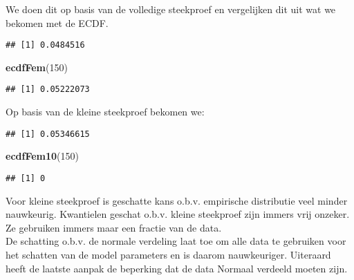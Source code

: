 \documentclass[
  12pt,dutch,coursenotes]{book}
\newenvironment{Shaded}{\begin{snugshade}}{\end{snugshade}}
\newcommand{\DecValTok}[1]{\textcolor[rgb]{0.00,0.00,0.81}{#1}}
\newcommand{\KeywordTok}[1]{\textcolor[rgb]{0.13,0.29,0.53}{\textbf{#1}}}
\newcommand{\NormalTok}[1]{#1}
\newcommand{\OperatorTok}[1]{\textcolor[rgb]{0.81,0.36,0.00}{\textbf{#1}}}
\theoremstyle{definition}
\theoremstyle{definition}
\theoremstyle{definition}
\theoremstyle{remark}
\begin{document}
We doen dit op basis van de volledige steekproef en vergelijken dit uit wat we bekomen met de ECDF.

\begin{Shaded}
\end{Shaded}

\begin{verbatim}
## [1] 0.0484516
\end{verbatim}

\begin{Shaded}
\begin{Highlighting}[]
\KeywordTok{ecdfFem}\NormalTok{(}\DecValTok{150}\NormalTok{)}
\end{Highlighting}
\end{Shaded}

\begin{verbatim}
## [1] 0.05222073
\end{verbatim}

Op basis van de kleine steekproef bekomen we:

\begin{Shaded}
\end{Shaded}

\begin{verbatim}
## [1] 0.05346615
\end{verbatim}

\begin{Shaded}
\begin{Highlighting}[]
\KeywordTok{ecdfFem10}\NormalTok{(}\DecValTok{150}\NormalTok{)}
\end{Highlighting}
\end{Shaded}

\begin{verbatim}
## [1] 0
\end{verbatim}

Voor kleine steekproef is geschatte kans o.b.v. empirische distributie veel minder nauwkeurig.
Kwantielen geschat o.b.v. kleine steekproef zijn immers vrij onzeker. Ze gebruiken immers maar een fractie van de data.\\
De schatting o.b.v. de normale verdeling laat toe om alle data te gebruiken voor het schatten van de model parameters en is daarom nauwkeuriger. Uiteraard heeft de laatste aanpak de beperking dat de data Normaal verdeeld moeten zijn.
\end{document}
